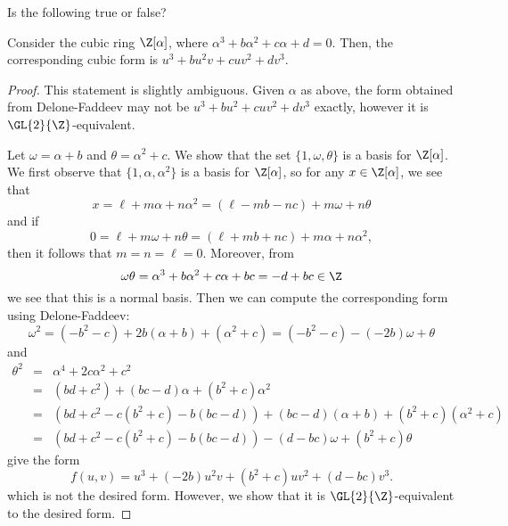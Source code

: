 \documentclass[10pt]{amsart}
\begin{document}
\begin{thm}[10 Points]
  Is the following true or false?
  
  Consider the cubic ring $\Z[\alpha]$, where $\alpha^3 + b\alpha^2 + c\alpha + d = 0$.
  Then, the corresponding cubic form is $u^3 + bu^2v + cuv^2 + dv^3$.
  
  \begin{proof}
    This statement is slightly ambiguous.
    Given $\alpha$ as above, the form obtained from Delone-Faddeev may not be $u^3 + bu^2 + cuv^2 + dv^3$ exactly, however it is $\GL{2}{\Z}$-equivalent.
    
    Let $\omega = \alpha + b$ and $\theta = \alpha^2 + c$.
    We show that the set $\{1, \omega, \theta\}$ is a basis for $\Z[\alpha]$.
    We first observe that $\{1, \alpha, \alpha^2\}$ is a basis for $\Z[\alpha]$, so for any $x \in \Z[\alpha]$, we see that
    $$x = \ell + m\alpha + n\alpha^2 = (\ell - mb - nc) + m\omega + n\theta$$
    and if
    $$0 = \ell + m\omega + n\theta = (\ell + mb + nc) + m\alpha + n\alpha^2,$$
    then it follows that $m = n = \ell = 0$.
    Moreover, from
    $$\omega\theta = \alpha^3 + b\alpha^2 + c\alpha + bc = -d + bc \in \Z$$
    we see that this is a normal basis.
    Then we can compute the corresponding form using Delone-Faddeev:
    $$\omega^2 = (-b^2 - c) + 2b(\alpha + b) + (\alpha^2 + c) = (-b^2 - c) - (-2b)\omega + \theta$$
    and
    \begin{eqnarray*}
      \theta^2 &=& \alpha^4 + 2c\alpha^2 + c^2\\
      &=& (bd + c^2) + (bc - d)\alpha + (b^2 + c)\alpha^2\\
      &=& (bd + c^2 - c(b^2 + c) - b(bc - d)) + (bc - d)(\alpha + b) + (b^2 + c)(\alpha^2 + c)\\
      &=& (bd + c^2 - c(b^2 + c) - b(bc - d)) - (d - bc)\omega + (b^2 + c)\theta
    \end{eqnarray*}
    give the form
    $$f(u,v) = u^3 + (-2b)u^2v + (b^2 + c)uv^2 + (d - bc)v^3.$$
    which is not the desired form.
    However, we show that it is $\GL{2}{\Z}$-equivalent to the desired form.
    

\end{proof}
\end{thm}
\end{document}
